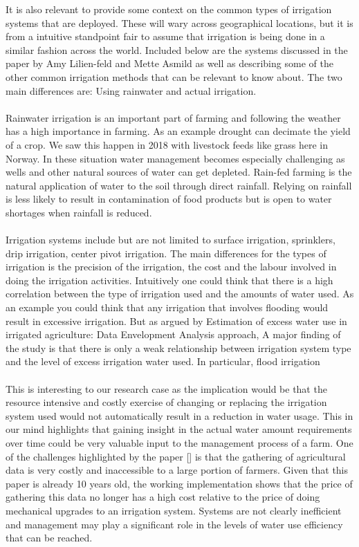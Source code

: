 \documentclass[]{uiophd}
\begin{document}
It is also relevant to provide some context on the common types of irrigation systems that are deployed. These will wary across geographical locations, but it is from a intuitive standpoint fair to assume that irrigation is being done in a similar fashion across the world. Included below are the systems discussed in the paper by  Amy Lilien-feld and Mette Asmild as well as describing some of the  other common irrigation methods that can be relevant to know about. The two main differences are: Using rainwater and actual irrigation. 
\\\\
Rainwater irrigation is an important part of farming and following the weather has a high importance in farming. As an example drought can decimate the yield of a crop. We saw this happen in 2018 with livestock feeds like grass here in Norway. In these situation water management becomes especially challenging as wells and other natural sources of water can get depleted. Rain-fed farming is the natural application of water to the soil through direct rainfall. Relying on rainfall is less likely to result in contamination of food products but is open to water shortages when rainfall is reduced. \cite{cdc}
\\\\
Irrigation systems include but are not limited to surface irrigation, sprinklers, drip irrigation, center pivot irrigation. The main differences for the types of irrigation is the precision of the irrigation, the cost and the labour involved in doing the irrigation activities. Intuitively one could think that there is a high correlation between the type of irrigation used and the amounts of water used. As an example you could think that any irrigation that involves flooding would result in excessive irrigation. But as argued by Estimation of excess water use in irrigated agriculture: Data Envelopment Analysis approach, A major finding of the study is that there is only a weak relationship between irrigation system type and the level of excess irrigation water used. In particular, flood irrigation \cite{LILIENFELD200773}
\\\\
This is interesting to our research case as the implication would be that the resource intensive and costly exercise of changing or replacing the irrigation system used would not automatically result in a reduction in water usage. This in our mind highlights that gaining insight in the actual water amount requirements over time could be very valuable input to the management process of a farm. One of  the challenges highlighted by the paper [] is that the gathering of agricultural data is very costly and inaccessible to a large portion of farmers. Given that this paper is already 10 years old, the working implementation shows that the price of gathering this data no longer has a high cost relative to the price of doing mechanical upgrades to an irrigation system. Systems are not clearly inefficient and management may play a significant role in the levels of water use efficiency that can be reached. \cite{LILIENFELD200773}
\end{document}
